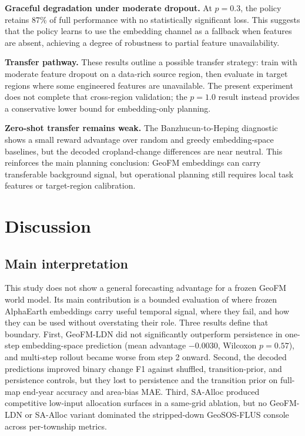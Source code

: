 \documentclass{article}
\begin{document}
\textbf{Graceful degradation under moderate dropout.} At $p=0.3$, the policy retains 87\% of full performance with no statistically significant loss. This suggests that the policy learns to use the embedding channel as a fallback when features are absent, achieving a degree of robustness to partial feature unavailability.

\textbf{Transfer pathway.} These results outline a possible transfer strategy: train with moderate feature dropout on a data-rich source region, then evaluate in target regions where some engineered features are unavailable. The present experiment does not complete that cross-region validation; the $p=1.0$ result instead provides a conservative lower bound for embedding-only planning.

\textbf{Zero-shot transfer remains weak.} The Banzhucun-to-Heping diagnostic shows a small reward advantage over random and greedy embedding-space baselines, but the decoded cropland-change differences are near neutral. This reinforces the main planning conclusion: GeoFM embeddings can carry transferable background signal, but operational planning still requires local task features or target-region calibration.



\section{Discussion}
\label{sec:discussion}

\subsection{Main interpretation}

This study does not show a general forecasting advantage for a frozen GeoFM world model. Its main contribution is a bounded evaluation of where frozen AlphaEarth embeddings carry useful temporal signal, where they fail, and how they can be used without overstating their role. Three results define that boundary. First, GeoFM-LDN did not significantly outperform persistence in one-step embedding-space prediction (mean advantage $-0.0030$, Wilcoxon $p=0.57$), and multi-step rollout became worse from step 2 onward. Second, the decoded predictions improved binary change F1 against shuffled, transition-prior, and persistence controls, but they lost to persistence and the transition prior on full-map end-year accuracy and area-bias MAE. Third, SA-Alloc produced competitive low-input allocation surfaces in a same-grid ablation, but no GeoFM-LDN or SA-Alloc variant dominated the stripped-down GeoSOS-FLUS console across per-township metrics.
\end{document}
